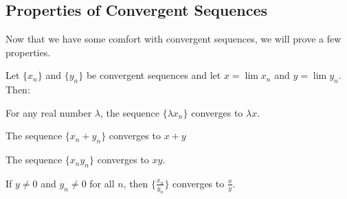\documentclass[../notes.tex]{subfiles}
\begin{document}
\subsection{Properties of Convergent Sequences}
Now that we have some comfort with convergent sequences, we will prove a few properties.
\begin{proposition} 
\label{prop:conv-is-linear}
    Let $\{x_n\}$ and $\{y_n\}$ be convergent sequences and let $x=\lim x_n$ and $y=\lim y_n$. Then:
    \begin{listalph}
        \item For any real number $\lambda$, the sequence $\{\lambda x_n\}$ converges to $\lambda x$. 
        \item The sequence $\{x_n+y_n\}$ converges to $x+y$
        \item The sequence $\{x_ny_n\}$ converges to $xy$.
        \item If $y\ne0$ and $y_n\ne0$ for all $n$, then $\big\{\frac{x_n}{y_n}\big\}$ converges to $\frac{x}{y}$. 
    \end{listalph}
\end{proposition}
\end{document}
